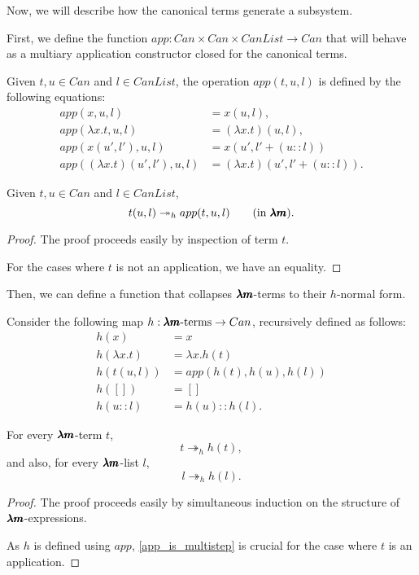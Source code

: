 Now, we will describe how the canonical terms generate a subsystem.

First, we define the function $app : Can \times Can \times CanList \to Can$ that will behave as a multiary application constructor closed for the canonical terms.

\begin{definition}
  Given $t, u \in Can$ and $l \in CanList$, the operation $app(t, u, l)$ is defined by the following equations:
  \begin{align*}
    app(x, u, l)                      &= x(u, l), \\
    app(\lambda x. t, u, l)           &= (\lambda x. t)(u, l), \\ 
    app(x(u', l'), u, l)              &= x(u', l' + (u::l)) \\
    app((\lambda x. t)(u', l'), u, l) &= (\lambda x. t)(u', l'+(u::l)).
  \end{align*}  
\end{definition}

\begin{lemma}
  \label{app_is_multistep}
  Given $t, u \in Can$ and $l \in CanList$, 
  \[ t(u, l) \twoheadrightarrow_h app(t, u, l) \qquad \text{(in $\pmb{\lambda m}$)}. \]
\end{lemma}
\begin{proof}
  The proof proceeds easily by inspection of term $t$.

  For the cases where $t$ is not an application, we have an equality.
\end{proof}

Then, we can define a function that collapses $\pmb{\lambda m}$-terms to their $h$-normal form.

\begin{definition}
  Consider the following map $h : \pmb{\lambda m} \text{-terms} \to Can$, recursively defined as follows:
  \begin{align*}
    h(x)            &= x \\
    h(\lambda x. t) &= \lambda x . h(t) \\
    h(t(u,l))       &= app(h(t), h(u), h(l)) \\
    h([])           &= [] \\
    h(u::l)         &= h(u)::h(l).
  \end{align*}
\end{definition}

\begin{proposition}
  \label{h_is_multistep}
  For every $\pmb{\lambda m}$-term $t$, \[ t \twoheadrightarrow_h h(t), \]
  and also, for every $\pmb{\lambda m}$-list $l$, \[ l \twoheadrightarrow_h h(l). \]
\end{proposition}
\begin{proof}
  The proof proceeds easily by simultaneous induction on the structure of $\pmb{\lambda m}$-expressions.

  As $h$ is defined using $app$, \cref{app_is_multistep} is crucial for the case where $t$ is an application. 
\end{proof}

